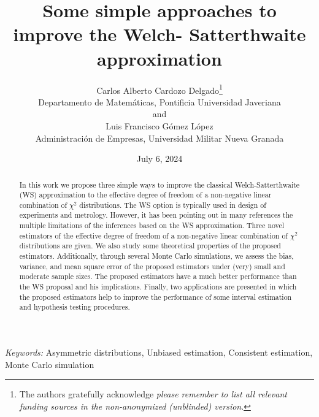 \documentclass[
  12pt]{article}
\begin{document}
\def\spacingset#1{\renewcommand{\baselinestretch}%
{#1}\small\normalsize} \spacingset{1}



\date{July 6, 2024}
\title{\bf Some simple approaches to improve the Welch- Satterthwaite
approximation}
\author{
Carlos Alberto Cardozo Delgado\thanks{The authors gratefully acknowledge
\emph{please remember to list all relevant funding sources in the
non-anonymized (unblinded) version}.}\\
Departamento de Matemáticas, Pontificia Universidad Javeriana\\
and\\Luis Francisco Gómez López\\
Administración de Empresas, Universidad Militar Nueva Granada\\
}
\maketitle

\bigskip
\bigskip
\begin{abstract}
In this work we propose three simple ways to improve the classical
Welch-Satterthwaite (WS) approximation to the effective degree of
freedom of a non-negative linear combination of \(\chi^2\)
distributions. The WS option is typically used in design of experiments
and metrology. However, it has been pointing out in many references the
multiple limitations of the inferences based on the WS approximation.
Three novel estimators of the effective degree of freedom of a
non-negative linear combination of \(\chi^2\) distributions are given.
We also study some theoretical properties of the proposed estimators.
Additionally, through several Monte Carlo simulations, we assess the
bias, variance, and mean square error of the proposed estimators under
(very) small and moderate sample sizes. The proposed estimators have a
much better performance than the WS proposal and his implications.
Finally, two applications are presented in which the proposed estimators
help to improve the performance of some interval estimation and
hypothesis testing procedures.
\end{abstract}

\noindent%
{\it Keywords:} Asymmetric distributions, Unbiased
estimation, Consistent estimation, Monte Carlo simulation
\vfill

\newpage
\spacingset{1.9} %
\end{document}
